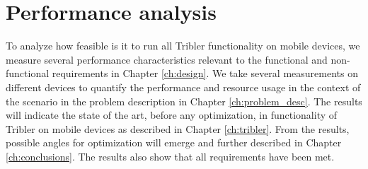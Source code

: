 \chapter{Performance analysis}\label{ch:results}
To analyze how feasible is it to run all Tribler functionality on mobile devices, we measure several performance characteristics relevant to the functional and non-functional requirements in Chapter \ref{ch:design}.
We take several measurements on different devices to quantify the performance and resource usage in the context of the scenario in the problem description in Chapter \ref{ch:problem_desc}.
The results will indicate the state of the art, before any optimization, in functionality of Tribler on mobile devices as described in Chapter \ref{ch:tribler}.
From the results, possible angles for optimization will emerge and further described in Chapter \ref{ch:conclusions}.
The results also show that all requirements have been met.


